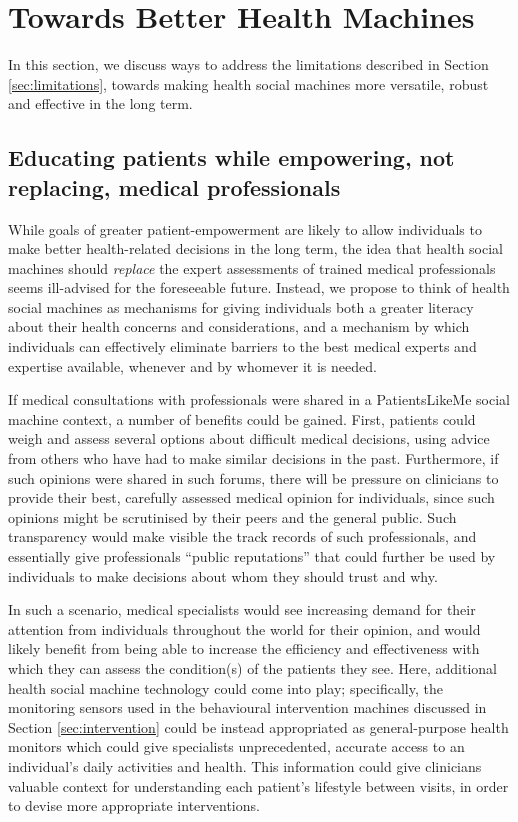 \documentclass{sig-alternate}
\begin{document}
\section{Towards Better Health Machines}

In this section, we discuss ways to address the limitations described
in Section \ref{sec:limitations}, towards making health social
machines more versatile, robust and effective in the long term.

\subsection{Educating patients while empowering, not replacing, medical professionals}

While goals of greater patient-empowerment are likely to allow
individuals to make better health-related decisions in the long term,
the idea that health social machines should \emph{replace} the expert
assessments of trained medical professionals seems ill-advised for the
foreseeable future. Instead, we propose to think of health social
machines as mechanisms for giving individuals both a greater literacy
about their health concerns and considerations, and a mechanism by
which individuals can effectively eliminate barriers to the best
medical experts and expertise available, whenever and by whomever it
is needed.

If medical consultations with professionals were shared in a
PatientsLikeMe social machine context, a number of benefits could be
gained.  First, patients could weigh and assess several options about
difficult medical decisions, using advice from others who have had to
make similar decisions in the past.  Furthermore, if such opinions
were shared in such forums, there will be pressure on clinicians to
provide their best, carefully assessed medical opinion for
individuals, since such opinions might be scrutinised by their peers
and the general public.  Such transparency would make visible the
track records of such professionals, and essentially give
professionals ``public reputations'' that could further be used by
individuals to make decisions about whom they should trust and why.

In such a scenario, medical specialists would see increasing demand
for their attention from individuals throughout the world for their
opinion, and would likely benefit from being able to increase the
efficiency and effectiveness with which they can assess the
condition(s) of the patients they see.  Here, additional health social
machine technology could come into play; specifically, the monitoring
sensors used in the behavioural intervention machines discussed in
Section \ref{sec:intervention} could be instead appropriated as
general-purpose health monitors which could give specialists
unprecedented, accurate access to an individual's daily activities and
health.  This information could give clinicians valuable context for
understanding each patient's lifestyle between visits, in order to
devise more appropriate interventions.
\end{document}
